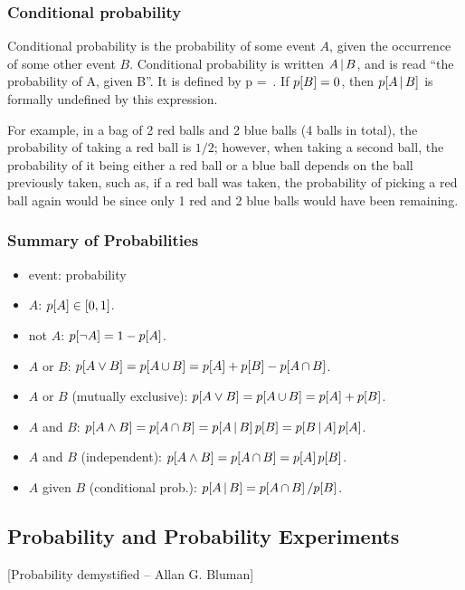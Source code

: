 \subsubsection{Conditional probability}
Conditional probability is the probability of some event $A$, given the occurrence of some other event $B$. Conditional probability is written $A\operatorname{\vert} B$, and is read ``the probability of A, given B''. It is defined by
\beq
p = \,.
\eeq
If $p\!\left[{B}\right] = 0$, then $p\!\left[{A\operatorname{\vert} B}\right]$ is formally undefined by this expression.

For example, in a bag of 2 red balls and 2 blue balls (4 balls in total), the probability of taking a red ball is $1/2$; however, when taking a second ball, the probability of it being either a red ball or a blue ball depends on the ball previously taken, such as, if a red ball was taken, the probability of picking a red ball again would be  since only 1 red and 2 blue balls would have been remaining.


\subsubsection{Summary of Probabilities}
\begin{itemize}
\item event: probability
\item $A$: $p\!\left[{A}\right]\in[0,1]$.
\item not $A$: $p\!\left[{\lnot A}\right] = 1-p\!\left[{A}\right]$.
\item $A$ or $B$: $p\!\left[{A\lor B}\right] = p\!\left[{A\operatorname{\cup} B}\right] = p\!\left[{A}\right] + p\!\left[{B}\right] - p\!\left[{A\operatorname{\cap} B}\right]$.
\item $A$ or $B$ (mutually exclusive): $p\!\left[{A\lor B}\right] = p\!\left[{A\operatorname{\cup} B}\right] = p\!\left[{A}\right] + p\!\left[{B}\right]$.
\item $A$ and $B$: $p\!\left[{A\land B}\right] = p\!\left[{A\operatorname{\cap} B}\right] = p\!\left[{A\operatorname{\vert} B}\right]p\!\left[{B}\right] = p\!\left[{B\operatorname{\vert} A}\right]p\!\left[{A}\right]$.
\item $A$ and $B$ (independent): $p\!\left[{A\land B}\right] = p\!\left[{A\operatorname{\cap} B}\right] = p\!\left[{A}\right] p\!\left[{B}\right]$.
\item $A$ given $B$ (conditional prob.): $p\!\left[{A\operatorname{\vert} B}\right] = p\!\left[{A\operatorname{\cap} B}\right]/p\!\left[{B}\right]$.
\end{itemize}


\subsection{Probability and Probability Experiments}
[Probability demystified -- Allan G. Bluman]

